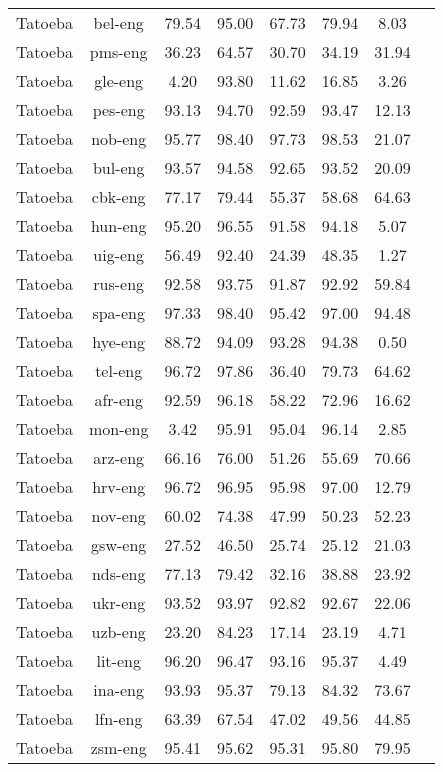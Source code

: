 \documentclass[11pt]{article}
\begin{document}
\begin{table*}[t!]
{\begin{tabular}{lc|cccccc}
Tatoeba & bel-eng & 79.54 & 95.00 & 67.73 & 79.94 & 8.03 \\
Tatoeba & pms-eng & 36.23 & 64.57 & 30.70 & 34.19 & 31.94 \\
Tatoeba & gle-eng & 4.20 & 93.80 & 11.62 & 16.85 & 3.26 \\
Tatoeba & pes-eng & 93.13 & 94.70 & 92.59 & 93.47 & 12.13 \\
Tatoeba & nob-eng & 95.77 & 98.40 & 97.73 & 98.53 & 21.07 \\
Tatoeba & bul-eng & 93.57 & 94.58 & 92.65 & 93.52 & 20.09 \\
Tatoeba & cbk-eng & 77.17 & 79.44 & 55.37 & 58.68 & 64.63 \\
Tatoeba & hun-eng & 95.20 & 96.55 & 91.58 & 94.18 & 5.07 \\
Tatoeba & uig-eng & 56.49 & 92.40 & 24.39 & 48.35 & 1.27 \\
Tatoeba & rus-eng & 92.58 & 93.75 & 91.87 & 92.92 & 59.84 \\
Tatoeba & spa-eng & 97.33 & 98.40 & 95.42 & 97.00 & 94.48 \\
Tatoeba & hye-eng & 88.72 & 94.09 & 93.28 & 94.38 & 0.50 \\
Tatoeba & tel-eng & 96.72 & 97.86 & 36.40 & 79.73 & 64.62 \\
Tatoeba & afr-eng & 92.59 & 96.18 & 58.22 & 72.96 & 16.62 \\
Tatoeba & mon-eng & 3.42 & 95.91 & 95.04 & 96.14 & 2.85 \\
Tatoeba & arz-eng & 66.16 & 76.00 & 51.26 & 55.69 & 70.66 \\
Tatoeba & hrv-eng & 96.72 & 96.95 & 95.98 & 97.00 & 12.79 \\
Tatoeba & nov-eng & 60.02 & 74.38 & 47.99 & 50.23 & 52.23 \\
Tatoeba & gsw-eng & 27.52 & 46.50 & 25.74 & 25.12 & 21.03 \\
Tatoeba & nds-eng & 77.13 & 79.42 & 32.16 & 38.88 & 23.92 \\
Tatoeba & ukr-eng & 93.52 & 93.97 & 92.82 & 92.67 & 22.06 \\
Tatoeba & uzb-eng & 23.20 & 84.23 & 17.14 & 23.19 & 4.71 \\
Tatoeba & lit-eng & 96.20 & 96.47 & 93.16 & 95.37 & 4.49 \\
Tatoeba & ina-eng & 93.93 & 95.37 & 79.13 & 84.32 & 73.67 \\
Tatoeba & lfn-eng & 63.39 & 67.54 & 47.02 & 49.56 & 44.85 \\
Tatoeba & zsm-eng & 95.41 & 95.62 & 95.31 & 95.80 & 79.95 \\

\end{tabular}}
\end{table*}
\end{document}
